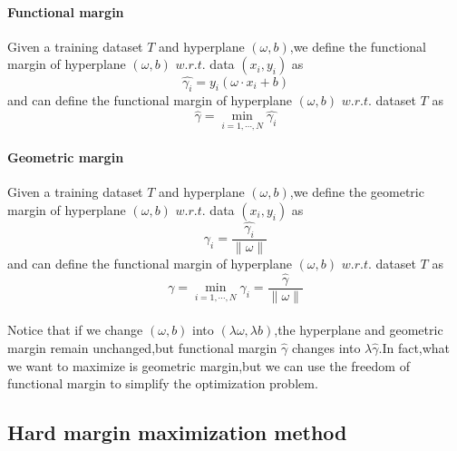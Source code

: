 \paragraph{Functional margin} Given a training dataset $T$ and hyperplane $\displaystyle(\omega,b)$,we define the functional margin of hyperplane $\displaystyle(\omega,b)$ $w.r.t.$ data $\displaystyle(x_{i},y_{i})$ as
\begin{equation}
\widehat{\gamma_{i}}=y_{i}(\omega\cdot x_{i}+b)
\end{equation}
and can define the functional margin of hyperplane $\displaystyle(\omega,b)$ $w.r.t.$ dataset $T$ as
\begin{equation}
\widehat{\gamma}=\min_{i=1,\cdots,N}\widehat{\gamma_{i}}
\end{equation}

\paragraph{Geometric margin} Given a training dataset $T$ and hyperplane $(\omega,b)$,we define the geometric margin of hyperplane $(\omega,b)$ $w.r.t.$ data $(x_{i},y_{i})$ as
\begin{equation}
\displaystyle\gamma_{i}=\frac{\widehat{\gamma_{i}}}{\|\omega\|}
\end{equation}
and can define the functional margin of hyperplane $(\omega,b)$ $w.r.t.$ dataset $T$ as
\begin{equation}
\displaystyle\gamma=\min_{i=1,\cdots,N}\gamma_{i}=\frac{\widehat{\gamma}}{\|\omega\|}
\end{equation}
\\Notice that if we change $(\omega,b)$ into $(\lambda\omega,\lambda b)$,the hyperplane and geometric margin remain unchanged,but functional margin $\displaystyle\widehat{\gamma}$ changes into $\displaystyle\lambda\widehat{\gamma}$.In fact,what we want to maximize is geometric margin,but we can use the freedom of functional margin to simplify the optimization problem.

\subsection{Hard margin maximization method}


